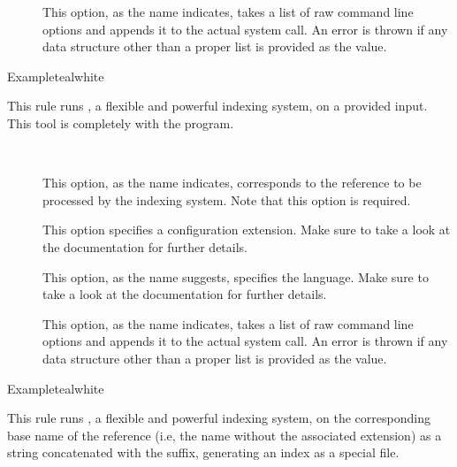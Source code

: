 \begin{description}
\begin{description}
\item[] This option, as the name indicates, takes a list of raw command line options and appends it to the actual system call. An error is thrown if any data structure other than a proper list is provided as the value.
\end{description}

\begin{codebox}{Example}{teal}{\icnote}{white}
\end{codebox}

\item[\rulebox{xindex}]
This rule runs , a flexible and powerful indexing system, on a provided  input. This tool is completely with the  program.

\begin{description}
\item[~\rqbox] This option, as the name indicates, corresponds to the  reference to be processed by the indexing system. Note that this option is required.

\item[] This option specifies a configuration extension. Make sure to take a look at the documentation for further details.

\item[] This option, as the name suggests, specifies the language. Make sure to take a look at the documentation for further details.

\item[] This option, as the name indicates, takes a list of raw command line options and appends it to the actual system call. An error is thrown if any data structure other than a proper list is provided as the value.
\end{description}

\begin{codebox}{Example}{teal}{\icnote}{white}
\end{codebox}

\item[\rulebox{xindy}]
This rule runs , a flexible and powerful indexing system, on the corresponding base name of the  reference (i.e, the name without the associated extension) as a string concatenated with the  suffix, generating an index as a special  file.


\end{description}

